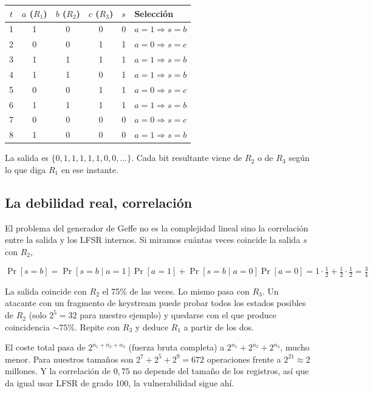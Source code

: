 \begin{center}
\begin{tabular}{c|ccc|c|l}
\hline
$t$ & $a$ ($R_1$) & $b$ ($R_2$) & $c$ ($R_3$) & $s$ & Selección \\
\hline
1 & 1 & 0 & 0 & 0 & $a=1 \Rightarrow s = b$ \\
2 & 0 & 0 & 1 & 1 & $a=0 \Rightarrow s = c$ \\
3 & 1 & 1 & 1 & 1 & $a=1 \Rightarrow s = b$ \\
4 & 1 & 1 & 0 & 1 & $a=1 \Rightarrow s = b$ \\
5 & 0 & 0 & 1 & 1 & $a=0 \Rightarrow s = c$ \\
6 & 1 & 1 & 1 & 1 & $a=1 \Rightarrow s = b$ \\
7 & 0 & 0 & 0 & 0 & $a=0 \Rightarrow s = c$ \\
8 & 1 & 0 & 0 & 0 & $a=1 \Rightarrow s = b$ \\
\hline
\end{tabular}
\end{center}

La salida es $\{0, 1, 1, 1, 1, 1, 0, 0, \ldots\}$.
Cada bit resultante viene de $R_2$ o de $R_3$ según lo que diga $R_1$ en ese instante.

\subsection{La debilidad real, correlación}

El problema del generador de Geffe no es la complejidad lineal sino la correlación entre la salida y los LFSR internos.
Si miramos cuántas veces coincide la salida $s$ con $R_2$,

\[
  \Pr[s = b] = \Pr[s = b \mid a = 1]\Pr[a = 1] + \Pr[s = b \mid a = 0]\Pr[a = 0]
  = 1 \cdot \tfrac{1}{2} + \tfrac{1}{2} \cdot \tfrac{1}{2} = \tfrac{3}{4}
\]

La salida coincide con $R_2$ el 75\% de las veces. Lo mismo pasa con $R_3$.
Un atacante con un fragmento de keystream puede probar todos los estados posibles de $R_2$
(solo $2^5 = 32$ para nuestro ejemplo) y quedarse con el que produce coincidencia $\sim 75\%$.
Repite con $R_3$ y deduce $R_1$ a partir de los dos.

El coste total pasa de $2^{n_1 + n_2 + n_3}$ (fuerza bruta completa) a $2^{n_1} + 2^{n_2} + 2^{n_3}$, mucho menor.
Para nuestros tamaños son $2^7 + 2^5 + 2^9 = 672$ operaciones frente a $2^{21} \approx 2$ millones.
Y la correlación de $0{,}75$ no depende del tamaño de los registros, así que da igual usar LFSR de grado 100,
la vulnerabilidad sigue ahí.

